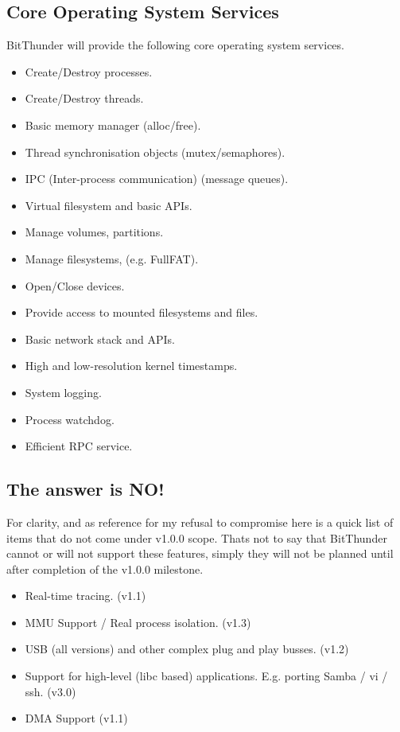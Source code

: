 \subsection{Core Operating System Services}
BitThunder will provide the following core operating system services.

\begin{itemize}
\item Create/Destroy processes.
\item Create/Destroy threads.
\item Basic memory manager (alloc/free).
\item Thread synchronisation objects (mutex/semaphores).
\item IPC (Inter-process communication) (message queues).
\item Virtual filesystem and basic APIs.
\item Manage volumes, partitions.
\item Manage filesystems, (e.g. FullFAT).
\item Open/Close devices.
\item Provide access to mounted filesystems and files.
\item Basic network stack and APIs.
\item High and low-resolution kernel timestamps.
\item System logging.
\item Process watchdog.
\item Efficient RPC service.
\end{itemize}

\subsection{The answer is NO!}
For clarity, and as reference for my refusal to compromise here is a quick list of items
that do not come under v1.0.0 scope. Thats not to say that BitThunder cannot or will not
support these features, simply they will not be planned until after completion of the
v1.0.0 milestone.

\begin{itemize}
\item Real-time tracing. (v1.1)
\item MMU Support / Real process isolation. (v1.3)
\item USB (all versions) and other complex plug and play busses. (v1.2)
\item Support for high-level (libc based) applications. E.g. porting Samba / vi / ssh. (v3.0)
\item DMA Support (v1.1)
\end{itemize}
